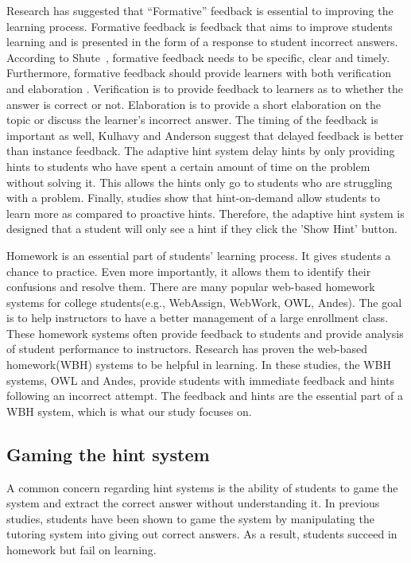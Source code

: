 \documentclass{llncs2e/llncs}
\begin{document}
Research has suggested that ``Formative'' feedback is essential to improving the learning process\cite{Azevedo1995}\cite{Bangert-Drowns1991}. Formative feedback is feedback that aims to improve students learning and is presented in the form of a response to student incorrect answers\cite{Shute2008}. According to Shute~\cite{Shute2008}, formative feedback needs to be specific, clear and timely. Furthermore, formative feedback should provide learners with both verification and elaboration \cite{Mason2001} \cite{Bangert-Drowns1991}. Verification is to provide feedback to learners as to whether the answer is correct or not. Elaboration is to provide a short elaboration on the topic or discuss the learner's incorrect answer. The timing of the feedback is important as well, Kulhavy and Anderson suggest that delayed feedback is better than instance feedback\cite{Kulhavy1972}. The adaptive hint system delay hints by only providing hints to students who have spent a certain amount of time on the problem without solving it. This allows the hints only go to students who are struggling with a problem. Finally, studies show that hint-on-demand allow students to learn more as compared to proactive hints\cite{Razzaq2010}. Therefore, the adaptive hint system is designed that a student will only see a hint if they click the 'Show Hint' button.

Homework is an essential part of students' learning process\cite{Cooper2006}. It gives students a chance to practice. Even more importantly, it allows them to identify their confusions and resolve them. There are many popular web-based homework systems for college students(e.g., WebAssign, WebWork, OWL, Andes). The goal is to help instructors to have a better management of a large enrollment class. These homework systems often provide feedback to students and provide analysis of student performance to instructors. Research has proven the web-based homework(WBH) systems to be helpful in learning\cite{MestHartRath2002}\cite{Vanlehn2005}. In these studies, the WBH systems, OWL and Andes, provide students with immediate feedback and hints following an incorrect attempt\cite{MestHartRath2002}\cite{Vanlehn2005}. The feedback and hints are the essential part of a WBH system, which is what our study focuses on.

\subsection*{Gaming the hint system}

A common concern regarding hint systems is the ability of students to game the system and extract the correct answer without understanding it\cite{Baker2004}\cite{Baker2005}. In previous studies, students have been shown to game the system by manipulating the tutoring system into giving out correct answers\cite{Baker2004Off-task}. As a result, students succeed in homework but fail on learning.
\end{document}

